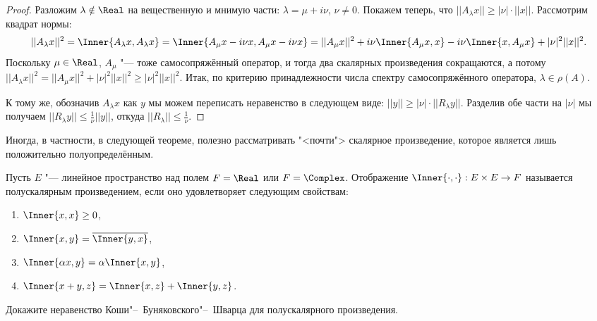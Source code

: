 \documentclass[main]{subfiles}
\begin{document}
\begin{proof}
  Разложим \( \lambda \notin \Real \)
  на вещественную и мнимую части:
  \( \lambda = \mu + i \nu \),
  \( \nu \ne 0 \).
  Покажем теперь, что
  \( ||A_\lambda x|| \ge |\nu| \cdot ||x|| \).
  Рассмотрим квадрат нормы:
  \[
    ||A_\lambda x||^2 =
    \Inner{A_\lambda x, A_\lambda x} =
    \Inner{A_\mu x - i \nu x, A_\mu x - i \nu x} =
    ||A_\mu x||^2 + i \nu \Inner{A_\mu x, x}
    - i \nu \Inner{x, A_\mu x} + |\nu|^2 ||x||^2.
  \]
  Поскольку \( \mu \in \Real \),
  \( A_\mu \) "--- тоже самосопряжённый оператор,
  и тогда два скалярных произведения сокращаются,
  а потому \( ||A_\lambda x||^2 = ||A_\mu x||^2 +
  |\nu|^2 ||x||^2 \ge |\nu|^2 ||x||^2 \).
  Итак, по критерию принадлежности числа спектру
  самосопряжённого оператора, \( \lambda \in \rho(A) \).

  К тому же, обозначив \( A_\lambda x \) как \( y \)
  мы можем переписать неравенство в следующем виде:
  \( ||y|| \ge |\nu| \cdot ||R_\lambda y|| \).
  Разделив обе части на \( |\nu| \) мы получаем
  \( ||R_\lambda y|| \le \frac1\nu ||y|| \),
  откуда \( ||R_\lambda|| \le \frac1\nu \).
\end{proof}

Иногда, в частности, в следующей теореме,
полезно рассматривать "<почти"> скалярное произведение,
которое является лишь положительно полуопределённым.

\begin{definition}
  Пусть \( E \) "--- линейное пространство
  над полем \( F = \Real \) или \( F = \Complex \).
  Отображение
  \( \Inner{\cdot, \cdot} : E \times E \to F \)
  называется полускалярным произведением,
  если оно удовлетворяет следующим свойствам:
  \begin{enumerate}
    \item \( \Inner{x, x} \ge 0 \),
    \item \( \Inner{x, y} = \overline{\Inner{y, x}} \),
    \item \( \Inner{\alpha x, y} = \alpha \Inner{x, y} \),
    \item \( \Inner{x + y, z} = \Inner{x, z} + \Inner{y, z} \).
  \end{enumerate}
\end{definition}

\begin{exercise}
  Докажите неравенство Коши"--~Буняковского"--~Шварца для полускалярного
  произведения.
\end{exercise}
\end{document}
